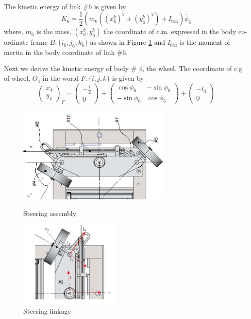 The kinetic energy of link  \#6 is given by
\begin{equation}
 K_6=\frac{1}{2}(m_6((x^b_6)^2+(y^b_6)^2)+I_{6zz})\dot{\phi_6}
\end{equation}
 where, $m_6$ is the mass, $(x^b_6,y^b_6)$  the coordinate of c.m.  expressed  in the body co-ordinate frame $B:\{i_6,j_6,k_6\}$ as shown in Figure \ref{fig:SteerLink} and $I_{6zz}$ is the moment of inertia in the body coordinate of link \#6.
 
 
 Next we derive the kinetic energy of body \# 4, the wheel. 
 The coordinate of c.g of wheel, $O_4$ in the world  $F:\{i,j,k\}$  is given by \[ \begin{pmatrix}
x_{4}\\y_{4} \end{pmatrix}_F
= \begin{pmatrix}-\frac{l}{2} \\0
\end{pmatrix}+
\begin{pmatrix}
		\cos\phi_6 &  -\sin\phi_6\\ -\sin\phi_6 & \cos\phi_6
\end{pmatrix} + 
\begin{pmatrix}
			-l_3\\0
\end{pmatrix}\]
\begin{figure}
	\begin{minipage}[t]{0.5\textwidth}
		\centering
		\includegraphics[width=3in]{Chapter4/fig/SteerModel} 
		\caption{Steering assembly}\label{fig:SteerAsm}
	\end{minipage}
	\hfill
	\begin{minipage}[t]{0.5\textwidth}
		\centering
		\includegraphics[width=2in]{Chapter4/fig/link} 
		\caption{Steering linkage }\label{fig:SteerLink}
	\end{minipage}
\end{figure}
 	
